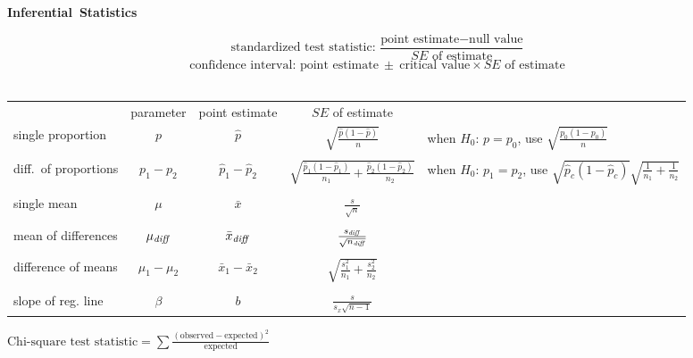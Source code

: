 \noindent%
\textbf{Inferential~Statistics} %

$$\text{standardized test statistic: }  \frac{\text{point estimate} - \text{null value}}{SE \text{ of estimate}}\qquad\ $$
$$\text{confidence interval: } \text{point estimate} \ \pm \ \text{critical value}\times SE \text{ of estimate}\qquad\ $$
\\[2mm]

\noindent%
\begin{tabular}{lcccl}
&parameter & point estimate &$SE$  of estimate& \\
single proportion &$p$ &$\hat{p}$ &$\sqrt{\frac{\hat{p}(1-\hat{p})}{n}}$ &
    {\footnotesize when $H_0$: $p=p_0$, use $\sqrt{\frac{p_0(1-p_0)}{n}}$} \\
\\
diff.~of proportions &
    $p_1-p_2$ & $\hat{p}_1-\hat{p}_2$ &
    $\sqrt{\frac{\hat{p}_1(1-\hat{p}_1)}{n_1}+
        \frac{\hat{p}_2(1-\hat{p}_2)}{n_2}}$ &
    {\footnotesize when $H_0$: $p_1=p_2$, use $\scriptscriptstyle{\sqrt{\hat{p}_c(1-\hat{p}_c)}\sqrt{\frac{1}{n_1}+\frac{1}{n_2}}}$} \\
    \\
single mean & $\mu$ & $\bar{x}$ & $\frac{s}{\sqrt{n}}$&\quad  \\
\\
mean of differences& $\mu_{\text{\emph{diff}}}$ & $\bar{x}_{\text{\emph{diff}}}$ & $\frac{s_{\text{\emph{diff}}}}{\sqrt{n_{\text{\emph{diff}}}}}$&\quad  \\
\\
difference of means & $\mu_1-\mu_2$ & $\bar{x}_1-\bar{x}_2$ & $\sqrt{\frac{s^2_1}{n_1}+\frac{s^2_2}{n_2}}$&\\
\\
slope of reg. line & $\beta$ & $b$ &  $\frac{s}{s_x\sqrt{n-1}}$
\end{tabular}
\vspace{1cm}

\noindent%
$\text{Chi-square test statistic} = \sum{\frac{(\text{observed} - \text{expected})^2}{\text{expected}}}$
\restoregeometry